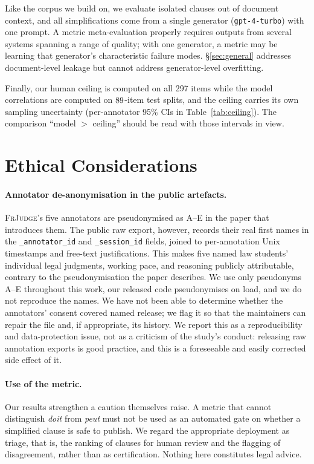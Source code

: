 \documentclass[11pt]{article}
\begin{document}
Like the corpus we build on, we evaluate isolated clauses out of document
context, and all simplifications come from a single generator
(\texttt{gpt-4-turbo}) with one prompt. A metric meta-evaluation properly
requires outputs from several systems spanning a range of quality; with one
generator, a metric may be learning that generator's characteristic failure
modes. \S\ref{sec:general} addresses document-level leakage but cannot address
generator-level overfitting.

Finally, our human ceiling is computed on all 297 items while the model
correlations are computed on $89$-item test splits, and the ceiling carries
its own sampling uncertainty (per-annotator 95\% CIs in
Table~\ref{tab:ceiling}). The comparison ``model $>$ ceiling'' should be read
with those intervals in view.

\section{Ethical Considerations}
\label{sec:ethics}

\paragraph{Annotator de-anonymisation in the public artefacts.}
\textsc{FrJudge}'s five annotators are pseudonymised as A--E in the paper that
introduces them. The public raw export, however, records their real first names
in the \texttt{\_annotator\_id} and \texttt{\_session\_id} fields, joined to
per-annotation Unix timestamps and free-text justifications. This makes five
named law students' individual legal judgments, working pace, and reasoning
publicly attributable, contrary to the pseudonymisation the paper describes. We
use only pseudonyms A--E throughout this work, our released code pseudonymises
on load, and we do not reproduce the names. We have not been able to determine
whether the annotators' consent covered named release; we flag it so that the
maintainers can repair the file and, if appropriate, its history. We report this
as a reproducibility and data-protection issue, not as a criticism of the
study's conduct: releasing raw annotation exports is good practice, and this is
a foreseeable and easily corrected side effect of it.

\paragraph{Use of the metric.}
Our results strengthen a caution \citet{beauchemin2025judgebert} themselves raise. A metric
that cannot distinguish \emph{doit} from \emph{peut} must not be used as an
automated gate on whether a simplified clause is safe to publish. We regard the
appropriate deployment as triage, that is, the ranking of clauses for human
review and the flagging of disagreement, rather than as certification. Nothing here constitutes legal
advice.
\end{document}
